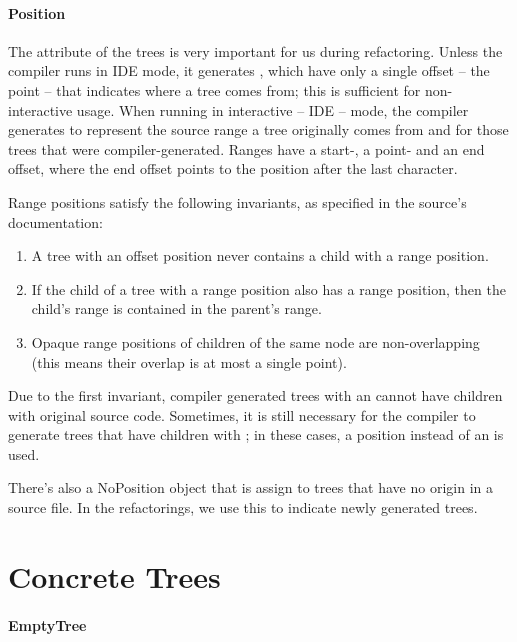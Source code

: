 \paragraph{Position}

\noindent The  attribute of the trees is very important for us during refactoring. Unless the compiler runs in IDE mode, it generates , which have only a single offset -- the point -- that indicates where a tree comes from; this is sufficient for non-interactive usage. When running in interactive -- IDE -- mode, the compiler generates  to represent the source range a tree originally comes from and  for those trees that were compiler-generated. Ranges have a start-, a point- and an end offset, where the end offset points to the position after the last character.

Range positions satisfy the following invariants, as specified in the  source's documentation:

\begin{enumerate}
  \item A tree with an offset position never contains a child with a range position.
  \item If the child of a tree with a range position also has a range position, then the child's range is contained in the parent's range.
  \item Opaque range positions of children of the same node are non-overlapping (this means their overlap is at most a single point).
\end{enumerate}

Due to the first invariant, compiler generated trees with an  cannot have children with original source code. Sometimes, it is still necessary for the compiler to generate trees that have children with ; in these cases, a  position instead of an  is used.

There's also a NoPosition object that is assign to trees that have no origin in a source file. In the refactorings, we use this to indicate newly generated trees.

\section{Concrete Trees}

\paragraph{EmptyTree} \hfill \begin{footnotesize}\end{footnotesize} \newline

